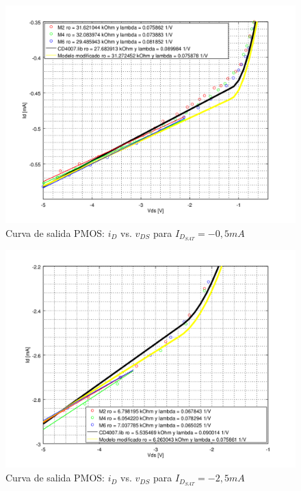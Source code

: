 \documentclass[10pt,spanish,a4paper,openany,notitlepage]{article}
\begin{document}
\begin{figure}[H] %
\begin{center}
\includegraphics[scale=0.65]{./octave/P_ID_VDS_500.png}
\caption{Curva de salida PMOS: $i_D$ vs. $v_{DS}$ para $I_{D_{SAT}} = -0,5 \unit{mA}$}
 \label{fig:P_ID_VDS_500}
\end{center}
\end{figure}

\begin{figure}[H] %
\begin{center}
\includegraphics[scale=0.65]{./octave/P_ID_VDS_2500.png}
\caption{Curva de salida PMOS: $i_D$ vs. $v_{DS}$ para $I_{D_{SAT}} = -2,5 \unit{mA}$}
 \label{fig:P_ID_VDS_2500}
\end{center}
\end{figure}
\end{document}
